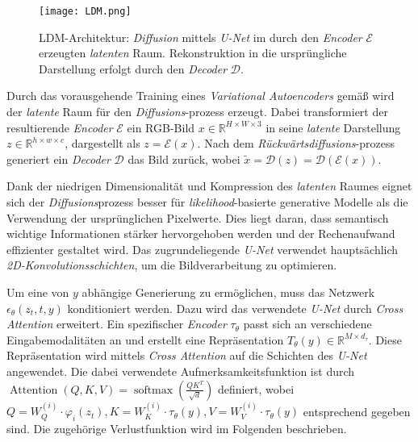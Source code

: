 \documentclass[
  a4paper,  %
  twoside,  %
  bibliography=totoc,
  headsepline,
  cleardoublepage=empty,
  parskip=half,
  draft=false
]{scrbook}
\begin{document}
\begin{figure}[h]
  \centering
  \texttt{[image: LDM.png]}
  \caption[LDM Architektur]{LDM-Architektur: \emph{Diffusion} mittels \emph{U-Net} im durch den \emph{Encoder} $\mathcal{E}$ erzeugten \emph{latenten} Raum. Rekonstruktion in die ursprüngliche Darstellung erfolgt durch den \emph{Decoder} $\mathcal{D}$. \cite{rombach_high-resolution_2022}}
  \label{fig:LDM}
\end{figure} 

Durch das vorausgehende Training eines \emph{Variational Autoencoders} \cite{kingma_auto-encoding_2022} gemäß \cite{esser_taming_2021} wird der \emph{latente} Raum für den \emph{Diffusions}-prozess erzeugt. Dabei transformiert der resultierende \emph{Encoder} $\mathcal{E}$ ein RGB-Bild $x \in \mathbb{R}^{H \times W \times 3}$ in seine \emph{latente} Darstellung $z \in \mathbb{R}^{h \times w \times c}$, dargestellt als $z=\mathcal{E}(x)$. Nach dem \emph{Rückwärtsdiffusions}-prozess generiert ein \emph{Decoder} $\mathcal{D}$ das Bild zurück, wobei $\tilde{x}=\mathcal{D}(z)=\mathcal{D}(\mathcal{E}(x))$. \cite{rombach_high-resolution_2022}

Dank der niedrigen Dimensionalität und Kompression des \emph{latenten} Raumes eignet sich der \emph{Diffusions}prozess besser für \emph{likelihood}-basierte generative Modelle als die Verwendung der ursprünglichen Pixelwerte. Dies liegt daran, dass semantisch wichtige Informationen stärker hervorgehoben werden und der Rechenaufwand effizienter gestaltet wird. Das zugrundeliegende \emph{U-Net} \cite{ronneberger_u-net_2015} verwendet hauptsächlich \emph{2D-Konvolutionsschichten}, um die Bildverarbeitung zu optimieren. \cite{rombach_high-resolution_2022}

Um eine von $y$ abhängige Generierung zu ermöglichen, muss das Netzwerk $\epsilon_\theta\left(z_t, t, y\right)$ konditioniert werden. Dazu wird das verwendete \emph{U-Net} durch \emph{Cross Attention} \cite{vaswani_attention_2017} erweitert. Ein spezifischer \emph{Encoder} $\tau_\theta$ passt sich an verschiedene Eingabemodalitäten an und erstellt eine Repräsentation $T_\theta(y) \in \mathbb{R}^{M \times d_\tau}$. Diese Repräsentation wird mittels \emph{Cross Attention} auf die Schichten des \emph{U-Net} angewendet. Die dabei verwendete Aufmerksamkeitsfunktion ist durch $\operatorname{Attention}(Q, K, V)=\operatorname{softmax}\left(\frac{Q K^T}{\sqrt{d}}\right)$ definiert, wobei  $Q=W_Q^{(i)} \cdot \varphi_i\left(z_t\right), K=W_K^{(i)} \cdot \tau_\theta(y), V=W_V^{(i)} \cdot \tau_\theta(y)$ entsprechend gegeben sind. Die zugehörige Verlustfunktion wird im Folgenden beschrieben. \cite{rombach_high-resolution_2022}
\end{document}
